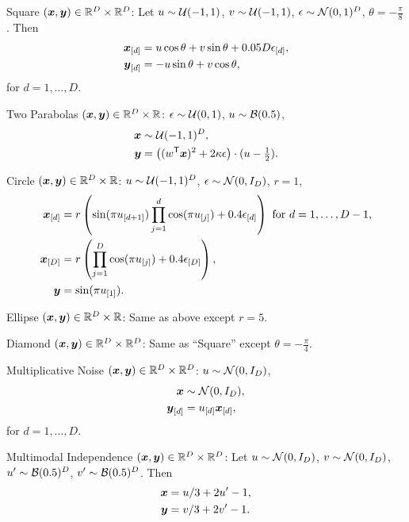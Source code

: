 \documentclass[11pt]{extarticle}
\begin{document}
\begin{compactenum}
\item Square $(\boldsymbol{x},\boldsymbol{y}) \in \mathbb{R}^{D} \times \mathbb{R}^{D}$: Let $u \sim \mathcal{U}(-1,1)$, $v \sim \mathcal{U}(-1,1)$, $\epsilon \sim \mathcal{N}(0,1)^{D}$, $\theta=-\frac{\pi}{8}$. Then
\begin{align*}
\boldsymbol{x}_{[d]}&=u \cos\theta + v \sin\theta + 0.05 D\epsilon_{[d]},\\
\boldsymbol{y}_{[d]}&=-u \sin\theta + v \cos\theta,
\end{align*}
for $d=1,\ldots,D$.
\item Two Parabolas $(\boldsymbol{x},\boldsymbol{y}) \in \mathbb{R}^{D} \times \mathbb{R}$: $\epsilon \sim \mathcal{U}(0,1)$, $u \sim \mathcal{B}(0.5)$,
\begin{align*}
\boldsymbol{x} &\sim \mathcal{U}(-1,1)^{D},\\
\boldsymbol{y}&=\left( (w^{\mathsf{T}} \boldsymbol{x})^2  + 2\kappa\epsilon\right) \cdot (u-\tfrac{1}{2}).
\end{align*}
\item Circle $(\boldsymbol{x},\boldsymbol{y}) \in \mathbb{R}^{D} \times \mathbb{R}$: $u \sim \mathcal{U}(-1,1)^{D}$, $\epsilon \sim \mathcal{N}(0, I_{D})$, $r=1$,
\begin{align*}
\boldsymbol{x}_{[d]}&=r \left(\sin(\pi u_{[d+1]})  \prod_{j=1}^{d} \cos(\pi u_{[j]})+0.4 \epsilon_{[d]}\right) \mbox{ for $d=1,\ldots,D-1$},\\
\boldsymbol{x}_{[D]}&=r \left(\prod_{j=1}^{D} \cos(\pi u_{[j]})+0.4 \epsilon_{[D]}\right),\\
\boldsymbol{y}&= \sin(\pi u_{[1]}).
\end{align*}
\item Ellipse $(\boldsymbol{x},\boldsymbol{y}) \in \mathbb{R}^{D} \times \mathbb{R}$: Same as above except $r=5$.
\item Diamond $(\boldsymbol{x},\boldsymbol{y}) \in \mathbb{R}^{D} \times \mathbb{R}^{D}$: Same as  ``Square'' except $\theta=-\frac{\pi}{4}$.
\item Multiplicative Noise $(\boldsymbol{x},\boldsymbol{y}) \in \mathbb{R}^{D} \times \mathbb{R}^{D}$: $u \sim \mathcal{N}(0, I_{D})$,
\begin{align*}
\boldsymbol{x} &\sim \mathcal{N}(0, I_{D}),\\
\boldsymbol{y}_{[d]}&=u_{[d]}\boldsymbol{x}_{[d]},
\end{align*}
for $d=1,\ldots,D$.
\item Multimodal Independence $(\boldsymbol{x},\boldsymbol{y}) \in \mathbb{R}^{D} \times \mathbb{R}^{D}$: Let $u \sim \mathcal{N}(0,I_{D})$, $v \sim \mathcal{N}(0,I_{D})$, $u' \sim \mathcal{B}(0.5)^{D}$, $v' \sim \mathcal{B}(0.5)^{D}$. Then
\begin{align*}
\boldsymbol{x}&=u/3+2u'-1,\\
\boldsymbol{y}&=v/3+2v'-1.
\end{align*}
\end{compactenum}
\end{document}
